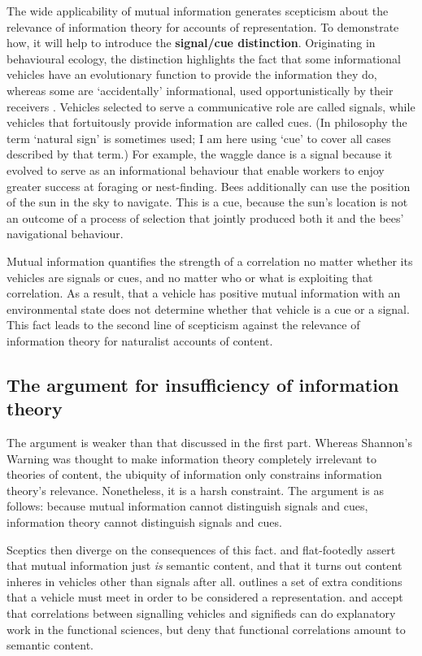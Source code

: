 The wide applicability of mutual information generates scepticism about the relevance of information theory for accounts of representation.
To demonstrate how, it will help to introduce the \textbf{signal/cue distinction}.
Originating in behavioural ecology, the distinction highlights the fact that some informational vehicles have an evolutionary function to provide the information they do, whereas some are `accidentally' informational, used opportunistically by their receivers \citep[PAGES]{maynardsmith2003animal}.
Vehicles selected to serve a communicative role are called signals, while vehicles that fortuitously provide information are called cues.
(In philosophy the term `natural sign' is sometimes used; I am here using `cue' to cover all cases described by that term.)
For example, the waggle dance is a signal because it evolved to serve as an informational behaviour that enable workers to enjoy greater success at foraging or nest-finding.
Bees additionally can use the position of the sun in the sky to navigate.
This is a cue, because the sun's location is not an outcome of a process of selection that jointly produced both it and the bees' navigational behaviour.

Mutual information quantifies the strength of a correlation no matter whether its vehicles are signals or cues, and no matter who or what is exploiting that correlation.
As a result, that a vehicle has positive mutual information with an environmental state does not determine whether that vehicle is a cue or a signal.
This fact leads to the second line of scepticism against the relevance of information theory for naturalist accounts of content.

\subsection{The argument for insufficiency of information theory}

The argument is weaker than that discussed in the first part.
Whereas Shannon's Warning was thought to make information theory completely irrelevant to theories of content, the ubiquity of information only constrains information theory's relevance.
Nonetheless, it is a harsh constraint.
The argument is as follows: because mutual information cannot distinguish signals and cues, information theory cannot distinguish signals and cues.

Sceptics then diverge on the consequences of this fact.
\citet{skyrms2010signals} and \citet{isaac2018semantics} flat-footedly assert that mutual information just \textit{is} semantic content, and that it turns out content inheres in vehicles other than signals after all.
\citet[SECTION]{shea2018representation} outlines a set of extra conditions that a vehicle must meet in order to be considered a representation. 
\citet{lean2014shannon} and \citet[CHAPTER]{hutto2017evolving} accept that correlations between signalling vehicles and signifieds can do explanatory work in the functional sciences, but deny that functional correlations amount to semantic content.

